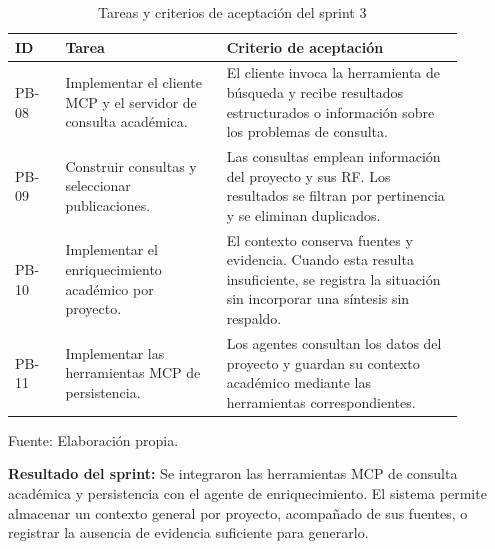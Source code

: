 \begin{table}[H]
    \centering
    \caption{Tareas y criterios de aceptación del sprint 3}
    \label{tab:sprint-3}
    \begingroup
    \small
    \setlength{\tabcolsep}{5pt}
    \renewcommand{\arraystretch}{1.15}
    \begin{tabular}{
        |>{\raggedright\arraybackslash}p{0.10\linewidth}
        |>{\raggedright\arraybackslash}p{0.32\linewidth}
        |>{\raggedright\arraybackslash}p{0.47\linewidth}|
    }
        \hline
        \textbf{ID} &
        \textbf{Tarea} &
        \textbf{Criterio de aceptación} \\
        \hline
        PB-08 &
        Implementar el cliente MCP y el servidor
        de consulta académica. &
        El cliente invoca la herramienta de búsqueda
        y recibe resultados estructurados o
        información sobre los problemas de consulta. \\
        \hline
        PB-09 &
        Construir consultas y seleccionar
        publicaciones. &
        Las consultas emplean información del
        proyecto y sus RF. Los resultados
        se filtran por pertinencia y se eliminan
        duplicados. \\
        \hline
        PB-10 &
        Implementar el enriquecimiento académico
        por proyecto. &
        El contexto conserva fuentes y evidencia.
        Cuando esta resulta insuficiente,
        se registra la situación sin incorporar
        una síntesis sin respaldo. \\
        \hline
        PB-11 &
        Implementar las herramientas MCP
        de persistencia. &
        Los agentes consultan los datos del proyecto
        y guardan su contexto académico mediante
        las herramientas correspondientes. \\
        \hline
    \end{tabular}

    \par\smallskip
    \begin{minipage}{0.95\linewidth}
        \footnotesize Fuente: Elaboración propia.
    \end{minipage}
    \endgroup
\end{table}

\noindent\textbf{Resultado del sprint:}
Se integraron las herramientas MCP de consulta académica
y persistencia con el agente de enriquecimiento.
El sistema permite almacenar un contexto general
por proyecto, acompañado de sus fuentes, o registrar
la ausencia de evidencia suficiente para generarlo.

